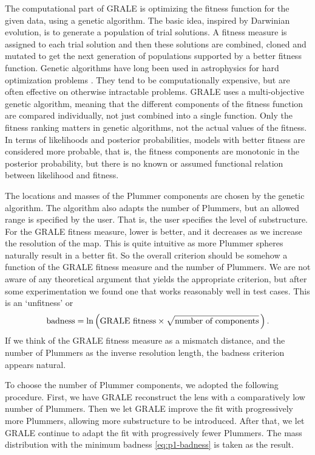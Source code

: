 \documentclass[
  11pt,
  twoside,
  openright,
  titlepage,
  headings=optiontoheadandtoc
]{scrbook}
\begin{document}
The computational part of GRALE is optimizing the fitness function for
the given data, using a genetic algorithm.  The basic idea, inspired
by Darwinian evolution, is to generate a population of trial
solutions. A fitness measure is assigned to each trial solution and
then these solutions are combined, cloned and mutated to get the next
generation of populations supported by a better fitness function.
Genetic algorithms have long been used in astrophysics for hard
optimization problems \citep[for a somewhat old but readable review,
  see][]{1995ApJS..101..309C}.  They tend to be computationally
expensive, but are often effective on otherwise intractable problems.
GRALE uses a multi-objective genetic algorithm, meaning that the
different components of the fitness function are compared
individually, not just combined into a single function.  Only the
fitness ranking matters in genetic algorithms, not the actual values
of the fitness.  In terms of likelihoods and posterior probabilities,
models with better fitness are considered more probable, that is, the
fitness components are monotonic in the posterior probability, but
there is no known or assumed functional relation between likelihood
and fitness.

The locations and masses of the Plummer components are chosen by the
genetic algorithm.  The algorithm also adapts the number of Plummers,
but an allowed range is specified by the user.  That is, the user
specifies the level of substructure.  For the GRALE fitness measure,
lower is better, and it decreases as we increase the resolution of the
map.  This is quite intuitive as more Plummer spheres naturally result
in a better fit.  So the overall criterion should be somehow a
function of the GRALE fitness measure and the number of Plummers.  We
are not aware of any theoretical argument that yields the appropriate
criterion, but after some experimentation we found one that works
reasonably well in test cases.  This is an `unfitness' or
\begin{equation} \label{eq:p1-badness}
\hbox{badness} = \ln\left(\hbox{GRALE fitness} \times
                     \sqrt{\hbox{number of components}}\,\right) .
\end{equation}
If we think of the GRALE fitness measure as a mismatch distance, and
the number of Plummers as the inverse resolution length, the badness
criterion appears natural.

To choose the number of Plummer components, we adopted the following
procedure.  First, we have GRALE reconstruct the lens with a
comparatively low number of Plummers.  Then we let GRALE improve the
fit with progressively more Plummers, allowing more substructure to be
introduced.  After that, we let GRALE continue to adapt the fit with
progressively fewer Plummers.  The mass distribution with the minimum
badness \eqref{eq:p1-badness} is taken as the result.
\end{document}

